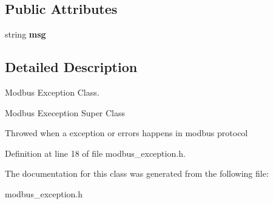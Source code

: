 \subsection*{Public Attributes}
\begin{DoxyCompactItemize}
\item 
\mbox{\label{classmodbus__exception_a96a89c2a5fafb8c5c11f04b93dfc616e}} 
string {\bfseries msg}
\end{DoxyCompactItemize}


\subsection{Detailed Description}
Modbus Exception Class. 

Modbus Exeception Super Class

Throwed when a exception or errors happens in modbus protocol 

Definition at line 18 of file modbus\+\_\+exception.\+h.



The documentation for this class was generated from the following file\+:\begin{DoxyCompactItemize}
\item 
modbus\+\_\+exception.\+h\end{DoxyCompactItemize}
